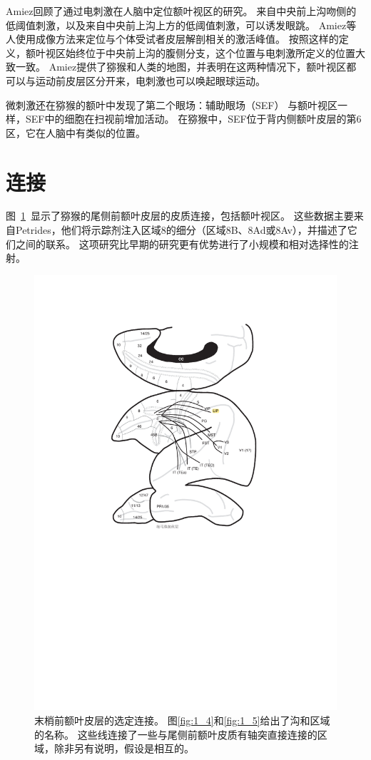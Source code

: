Amiez\cite{amiez2009anatomical}回顾了通过电刺激在人脑中定位额叶视区的研究。
来自中央前上沟吻侧的低阈值刺激，以及来自中央前上沟上方的低阈值刺激，可以诱发眼跳。
Amiez等人\cite{amiez2006local}使用成像方法来定位与个体受试者皮层解剖相关的激活峰值。
按照这样的定义，额叶视区始终位于中央前上沟的腹侧分支，这个位置与电刺激所定义的位置大致一致。
Amiez\cite{amiez2009anatomical}提供了猕猴和人类的地图，并表明在这两种情况下，额叶视区都可以与运动前皮层区分开来，电刺激也可以唤起眼球运动。


微刺激还在猕猴的额叶中发现了第二个眼场：辅助眼场（SEF） \cite{schlag1987evidence}与额叶视区一样，SEF中的细胞在扫视前增加活动\cite{hanes1995relationship}。
在猕猴中，SEF位于背内侧额叶皮层的第6区\cite{schlag1987evidence}，它在人脑中有类似的位置\cite{amiez2009anatomical}。



\section{连接}

图~\ref{fig:fig_5_2}~显示了猕猴的尾侧前额叶皮层的皮质连接，包括额叶视区。
这些数据主要来自Petrides\cite{petrides1999dorsolateral}，他们将示踪剂注入区域8的细分（区域8B、8Ad或8Av），并描述了它们之间的联系。
这项研究比早期的研究更有优势\cite{petrides1984projections,barbas1988anatomic,barbas1989architecture,cavada1989posterior}进行了小规模和相对选择性的注射。


\begin{figure}
	\centering
	\includegraphics[width=0.7\linewidth]{image_pfc/Fig_5_2}
	\caption{末梢前额叶皮层的选定连接。
		图\ref{fig:1_4}和\ref{fig:1_5}给出了沟和区域的名称。
		这些线连接了一些与尾侧前额叶皮质有轴突直接连接的区域，除非另有说明，假设是相互的。}
	\label{fig:fig_5_2}
\end{figure}



